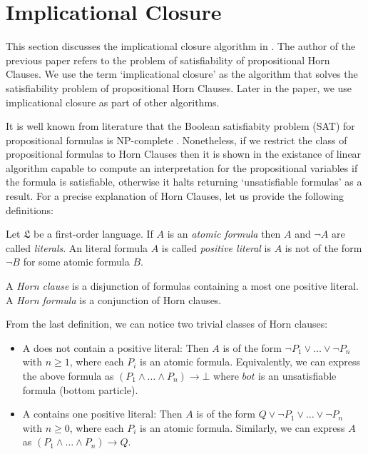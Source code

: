 \section{Implicational Closure}

This section discusses the implicational closure algorithm in \cite{DOWLING1984267}.
The author of the previous paper refers to the problem of satisfiability of
propositional Horn Clauses. We use the term `implicational closure'
as the algorithm that solves the satisfiability problem of propositional Horn
Clauses. Later in the paper, we use implicational closure as part of other
algorithms.

It is well known from literature that the Boolean satisfiabity problem (SAT)
for propositional formulas is NP-complete \cite{Cormen:2009:IAT:1614191}.
Nonetheless, if we restrict the class of propositional formulas to Horn Clauses
then it is shown in \cite{DOWLING1984267} the existance of linear algorithm
capable to compute an interpretation for the propositional variables if the
formula is satisfiable, otherwise it halts returning `unsatisfiable formulas'
as a result. For a precise explanation of Horn Clauses, let us provide the
following definitions:

 Let $\mathfrak{L}$ be a first-order
language. If $A$ is an \textit{atomic formula} then $A$ and $\neg A$ are
called \textit{literals}. An literal formula $A$ is called \textit{positive
literal} is $A$ is not of the form $\neg B$ for some atomic formula $B$.

 A \textit{Horn clause} is a disjunction
of formulas containing a most one positive literal. A \textit{Horn formula} is a
conjunction of Horn clauses.

From the last definition, we can notice two trivial classes of Horn clauses:

\begin{itemize}
\item A does not contain a positive literal: Then $A$ is of the form $\neg P_1
  \lor \dots \lor \neg P_n$ with $n \geq 1$, where each $P_i$ is an atomic formula.
  Equivalently, we can express the above formula as $(P_1 \land \dots \land P_n)
  \rightarrow \bot$ where $bot$ is an unsatisfiable formula (bottom particle).
\item A contains one positive literal: Then $A$ is of the form $Q \lor \neg P_1
  \lor \dots \lor \neg P_n$ with $n \geq 0$, where each $P_i$ is an atomic
  formula. Similarly, we can express $A$ as $(P_1 \land \dots \land P_n)
  \rightarrow Q$.
\end{itemize}

